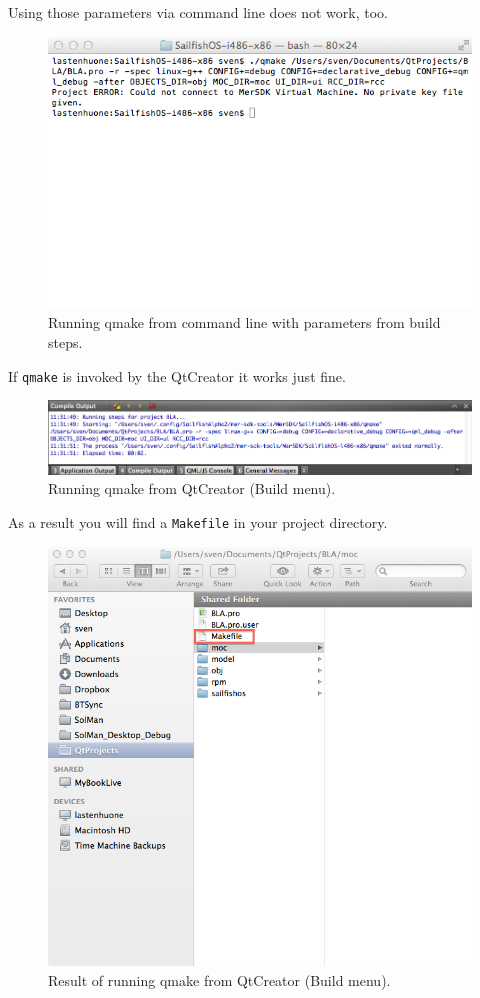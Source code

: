 %
Using those parameters via command line does not work, too.
\begin{figure}[H]
  \centering
  \includegraphics[scale=0.6]{../media/gfx/bash/qmakewithparam.png} 
  \caption{Running qmake from command line with parameters from build steps.}
  \label{fig:qmake486buildstepsparamcommandline}
\end{figure}
%
If \verb,qmake, is invoked by the QtCreator it works just fine.
\begin{figure}[H]
  \centering
  \includegraphics[scale=0.5]{../media/gfx/QtCreator/qmakerunfromqtcreator.png} 
  \caption{Running qmake from QtCreator (Build menu).}
  \label{fig:qmake486runfromqtcreator}
\end{figure}
%
As a result you will find a \verb,Makefile, in your project directory.
\begin{figure}[H]
  \centering
  \includegraphics[scale=0.5]{../media/gfx/QtCreator/qmakeresult.png} 
  \caption{Result of running qmake from QtCreator (Build menu).}
  \label{fig:qmake486result}
\end{figure}
